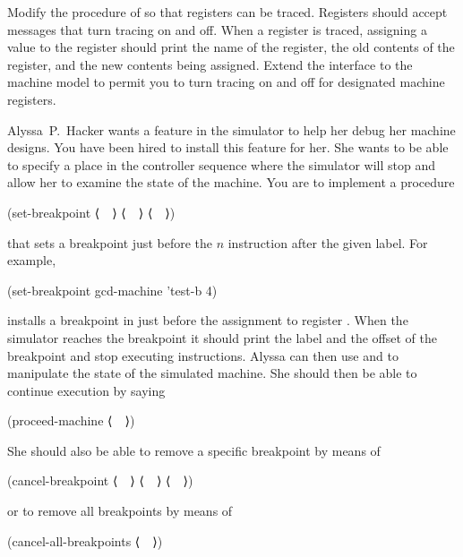 \begin{exercise}
	\label{Exercise 5.18}
	Modify the  procedure of  so that registers can be traced.
	Registers should accept messages that turn tracing on and off.
	When a register is traced, assigning a value to the register should print the name of the register, the old contents of the register, and the new contents being assigned.
	Extend the interface to the machine model to permit you to turn tracing on and off for designated machine registers.
\end{exercise}



\begin{exercise}
	\label{Exercise 5.19}
	Alyssa P. Hacker wants a  feature in the simulator to help her debug her machine designs.
	You have been hired to install this feature for her.
	She wants to be able to specify a place in the controller sequence where the simulator will stop and allow her to examine the state of the machine.
	You are to implement a procedure
	\begin{scheme}
	  (set-breakpoint ⟨~~⟩ ⟨~~⟩ ⟨~~⟩)
	\end{scheme}
	that sets a breakpoint just before the \( n \) instruction after the given label.
	For example,
	\begin{scheme}
	  (set-breakpoint gcd-machine 'test-b 4)
	\end{scheme}
	installs a breakpoint in  just before the assignment to register \code{a}.
	When the simulator reaches the breakpoint it should print the label and the offset of the breakpoint and stop executing instructions.
	Alyssa can then use  and  to manipulate the state of the simulated machine.
	She should then be able to continue execution by saying
	\begin{scheme}
	  (proceed-machine ⟨~~⟩)
	\end{scheme}
	She should also be able to remove a specific breakpoint by means of
	\begin{scheme}
	  (cancel-breakpoint ⟨~~⟩ ⟨~~⟩ ⟨~~⟩)
	\end{scheme}
	or to remove all breakpoints by means of
	\begin{scheme}
	  (cancel-all-breakpoints ⟨~~⟩)
	\end{scheme}
\end{exercise}
